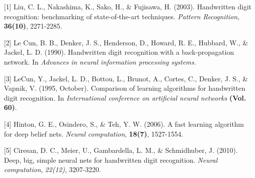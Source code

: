 \documentclass{article} %
\begin{document}
\small{
[1] Liu, C. L., Nakashima, K., Sako, H., \& Fujisawa, H. (2003). Handwritten
digit recognition: benchmarking of state-of-the-art techniques. {\it Pattern
    Recognition}, {\bf 36(10)}, 2271-2285.

[2] Le Cun, B. B., Denker, J. S., Henderson, D., Howard, R. E., Hubbard, W., \&
Jackel, L. D. (1990). Handwritten digit recognition with a back-propagation
network. In {\it Advances in neural information processing systems.}

[3] LeCun, Y., Jackel, L. D., Bottou, L., Brunot, A., Cortes, C., Denker, J.
S., \& Vapnik, V. (1995, October). Comparison of learning algorithms for
handwritten digit recognition. In {\it International conference on artificial
    neural networks} {\bf (Vol. 60)}.

[4] Hinton, G. E., Osindero, S., \& Teh, Y. W. (2006). A fast learning
algorithm for deep belief nets. {\it Neural computation}, {\bf 18(7)}, 1527-1554.

[5] Ciresan, D. C., Meier, U., Gambardella, L. M., \& Schmidhuber, J. (2010).
Deep, big, simple neural nets for handwritten digit recognition. {\it Neural
    computation}, {\it 22(12)}, 3207-3220.
}
\end{document}
